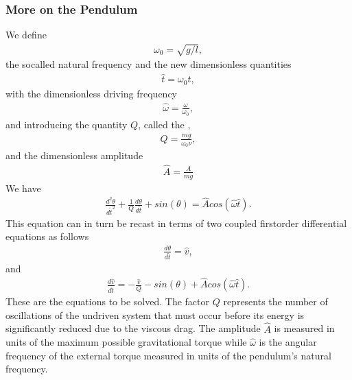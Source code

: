 \documentclass[letterpaper,10pt,english]{sphinxmanual}
\begin{document}
\subsubsection{More on the Pendulum}
\label{\detokenize{chapter3:id1}}
We define
\begin{equation*}
\begin{split}
\omega_0=\sqrt{g/l},
\end{split}
\end{equation*}
the so\sphinxhyphen{}called natural frequency and the new dimensionless quantities
\begin{equation*}
\begin{split}
\hat{t}=\omega_0t,
\end{split}
\end{equation*}
with the dimensionless driving frequency
\begin{equation*}
\begin{split}
\hat{\omega}=\frac{\omega}{\omega_0},
\end{split}
\end{equation*}
and introducing the quantity \(Q\), called the ,
\begin{equation*}
\begin{split}
Q=\frac{mg}{\omega_0\nu},
\end{split}
\end{equation*}
and the dimensionless amplitude
\begin{equation*}
\begin{split}
\hat{A}=\frac{A}{mg}
\end{split}
\end{equation*}
We have
\begin{equation*}
\begin{split}
\frac{d^2\theta}{d\hat{t}^2}+\frac{1}{Q}\frac{d\theta}{d\hat{t}}  
     +sin(\theta)=\hat{A}cos(\hat{\omega}\hat{t}).
\end{split}
\end{equation*}
This equation can in turn be recast in terms of two coupled first\sphinxhyphen{}order differential equations as follows
\begin{equation*}
\begin{split}
\frac{d\theta}{d\hat{t}}=\hat{v},
\end{split}
\end{equation*}
and
\begin{equation*}
\begin{split}
\frac{d\hat{v}}{d\hat{t}}=-\frac{\hat{v}}{Q}-sin(\theta)+\hat{A}cos(\hat{\omega}\hat{t}).
\end{split}
\end{equation*}
These are the equations to be solved.  The factor \(Q\) represents the number of oscillations of the undriven system that must occur before  its energy is significantly reduced due to the viscous drag. The  amplitude \(\hat{A}\) is measured in units of the maximum possible  gravitational torque while \(\hat{\omega}\) is the angular frequency of the external torque measured in units of the pendulum’s natural frequency.







\renewcommand{\indexname}{Index}
\printindex
\end{document}
